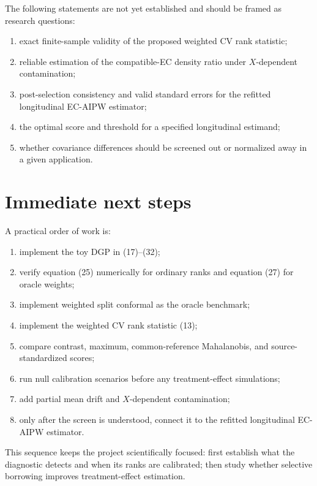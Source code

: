 \documentclass[11pt]{article}
\begin{document}
The following statements are not yet established and should be framed as research questions:
\begin{enumerate}
    \item exact finite-sample validity of the proposed weighted CV rank statistic;
    \item reliable estimation of the compatible-EC density ratio under $X$-dependent contamination;
    \item post-selection consistency and valid standard errors for the refitted longitudinal EC-AIPW estimator;
    \item the optimal score and threshold for a specified longitudinal estimand;
    \item whether covariance differences should be screened out or normalized away in a given application.
\end{enumerate}

\section{Immediate next steps}

A practical order of work is:
\begin{enumerate}
    \item implement the toy DGP in (17)--(32);
    \item verify equation (25) numerically for ordinary ranks and equation (27) for oracle weights;
    \item implement weighted split conformal as the oracle benchmark;
    \item implement the weighted CV rank statistic (13);
    \item compare contrast, maximum, common-reference Mahalanobis, and source-standardized scores;
    \item run null calibration scenarios before any treatment-effect simulations;
    \item add partial mean drift and $X$-dependent contamination;
    \item only after the screen is understood, connect it to the refitted longitudinal EC-AIPW estimator.
\end{enumerate}

This sequence keeps the project scientifically focused: first establish what the diagnostic detects and when its ranks are calibrated; then study whether selective borrowing improves treatment-effect estimation.
\end{document}
